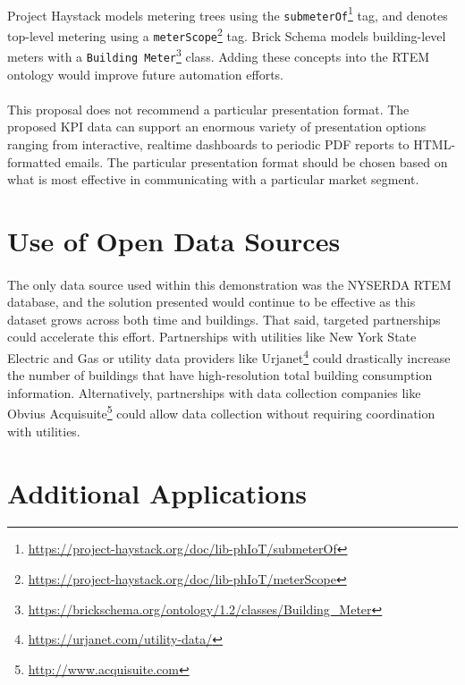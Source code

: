 \documentclass[a4paper]{article}
\begin{document}
\paragraph{}
Project Haystack models metering trees using the \texttt{submeterOf}\footnote{\url{https://project-haystack.org/doc/lib-phIoT/submeterOf}} tag, and denotes top-level metering using a \texttt{meterScope}\footnote{\url{https://project-haystack.org/doc/lib-phIoT/meterScope}} tag. Brick Schema models building-level meters with a \texttt{Building Meter}\footnote{\url{https://brickschema.org/ontology/1.2/classes/Building\_Meter}} class. Adding these concepts into the RTEM ontology would improve future automation efforts.

\paragraph{}
This proposal does not recommend a particular presentation format. The proposed KPI data can support an enormous variety of presentation options ranging from interactive, realtime dashboards to periodic PDF reports to HTML-formatted emails. The particular presentation format should be chosen based on what is most effective in communicating with a particular market segment.

\section{Use of Open Data Sources}

\paragraph{}
The only data source used within this demonstration was the NYSERDA RTEM database, and the solution presented would continue to be effective as this dataset grows across both time and buildings. That said, targeted partnerships could accelerate this effort. Partnerships with utilities like New York State Electric and Gas or utility data providers like Urjanet\footnote{\url{https://urjanet.com/utility-data/}} could drastically increase the number of buildings that have high-resolution total building consumption information. Alternatively, partnerships with data collection companies like Obvius Acquisuite\footnote{\url{http://www.acquisuite.com}} could allow data collection without requiring coordination with utilities. 


\section{Additional Applications}
\end{document}
